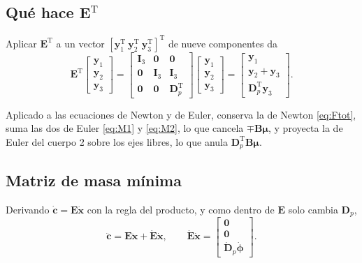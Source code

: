 \documentclass[11pt]{article}
\newcommand{\T}{^{\mathrm{T}}}
\newcommand{\muv}{\boldsymbol{\mu}}
\newcommand{\cd}{\dot{\mathbf{c}}}
\newcommand{\cdd}{\ddot{\mathbf{c}}}
\newcommand{\xd}{\dot{\mathbf{x}}}
\newcommand{\xdd}{\ddot{\mathbf{x}}}
\begin{document}
\subsection{Qué hace $\mathbf{E}\T$}

Aplicar $\mathbf{E}\T$ a un vector $[\mathbf{y}_1\T\ \mathbf{y}_2\T\ \mathbf{y}_3\T]\T$ de nueve componentes da
\begin{equation}
\mathbf{E}\T\begin{bmatrix}\mathbf{y}_1\\ \mathbf{y}_2\\ \mathbf{y}_3\end{bmatrix}
=\begin{bmatrix}\mathbf{I}_3 & \mathbf{0} & \mathbf{0}\\ \mathbf{0} & \mathbf{I}_3 & \mathbf{I}_3\\ \mathbf{0} & \mathbf{0} & \mathbf{D}_p\T\end{bmatrix}
\begin{bmatrix}\mathbf{y}_1\\ \mathbf{y}_2\\ \mathbf{y}_3\end{bmatrix}
=\begin{bmatrix}\mathbf{y}_1\\ \mathbf{y}_2+\mathbf{y}_3\\ \mathbf{D}_p\T\mathbf{y}_3\end{bmatrix}.
\label{eq:ETv}
\end{equation}

Aplicado a las ecuaciones de Newton y de Euler, conserva la de Newton \eqref{eq:Ftot}, suma las dos de Euler \eqref{eq:M1} y \eqref{eq:M2}, lo que cancela $\mp\mathbf{B}\muv$, y proyecta la de Euler del cuerpo 2 sobre los ejes libres, lo que anula $\mathbf{D}_p\T\mathbf{B}\muv$.

\subsection{Matriz de masa mínima}

Derivando $\cd=\mathbf{E}\xd$ con la regla del producto, y como dentro de $\mathbf{E}$ solo cambia $\mathbf{D}_p$,
\begin{equation}
\cdd=\mathbf{E}\xdd+\dot{\mathbf{E}}\xd,
\qquad
\dot{\mathbf{E}}\xd=\begin{bmatrix}\mathbf{0}\\ \mathbf{0}\\ \dot{\mathbf{D}}_p\dot{\boldsymbol{\phi}}\end{bmatrix}.
\label{eq:cddx}
\end{equation}
\end{document}
